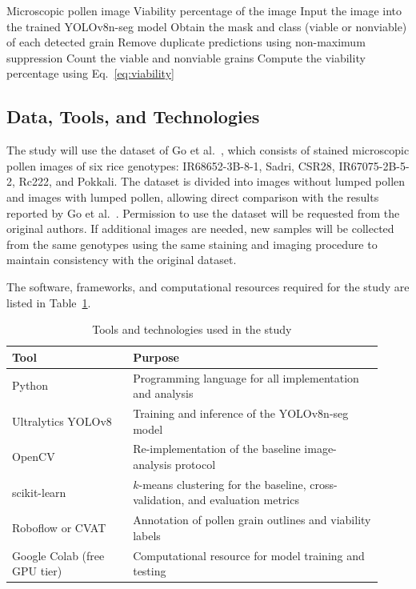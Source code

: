 \begin{algorithm}[H]
\caption{Proposed pollen viability estimation}
\label{alg:proposed}
\begin{algorithmic}[1]
\Require Microscopic pollen image
\Ensure Viability percentage of the image
\State Input the image into the trained YOLOv8n-seg model
\State Obtain the mask and class (viable or nonviable) of each detected grain
\State Remove duplicate predictions using non-maximum suppression
\State Count the viable and nonviable grains
\State Compute the viability percentage using Eq.~\eqref{eq:viability}
\end{algorithmic}
\end{algorithm}

\subsection{Data, Tools, and Technologies}
\label{sec:m-data-tools}

The study will use the dataset of Go et al.~\cite{go2019}, which consists of stained microscopic pollen images of six rice genotypes: IR68652-3B-8-1, Sadri, CSR28, IR67075-2B-5-2, Rc222, and Pokkali. The dataset is divided into images without lumped pollen and images with lumped pollen, allowing direct comparison with the results reported by Go et al.~\cite{go2019}. Permission to use the dataset will be requested from the original authors. If additional images are needed, new samples will be collected from the same genotypes using the same staining and imaging procedure to maintain consistency with the original dataset.

The software, frameworks, and computational resources required for the study are listed in Table~\ref{tab:tools}.

\begin{table}[H]
    \centering
    \caption{Tools and technologies used in the study}
    \label{tab:tools}
    \begin{tabular}{p{0.30\linewidth} p{0.62\linewidth}}
        \toprule
        \textbf{Tool} & \textbf{Purpose} \\
        \midrule
        Python & Programming language for all implementation and analysis \\
        Ultralytics YOLOv8~\cite{jocher2023yolov8} & Training and inference of the YOLOv8n-seg model \\
        OpenCV & Re-implementation of the baseline image-analysis protocol \\
        scikit-learn & $k$-means clustering for the baseline, cross-validation, and evaluation metrics \\
        Roboflow or CVAT & Annotation of pollen grain outlines and viability labels \\
        Google Colab (free GPU tier) & Computational resource for model training and testing \\
        \bottomrule
    \end{tabular}
\end{table}

